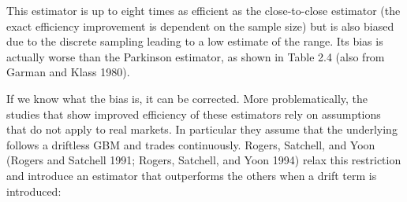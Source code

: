 \documentclass[11pt]{report}
\begin{document}
		This estimator is up to eight times as efficient as the close-to-close estimator (the exact efficiency improvement is dependent on the sample size) but is also biased due to the discrete sampling leading to a low estimate of the range. Its bias is actually worse than the Parkinson estimator, as shown in Table 2.4 (also from Garman and Klass 1980).
		
		If we know what the bias is, it can be corrected. More problematically, the studies that show improved efficiency of these estimators rely on assumptions that do not apply to real markets. In particular they assume that the underlying follows a driftless GBM and trades continuously. Rogers, Satchell, and Yoon (Rogers and Satchell 1991; Rogers, Satchell, and Yoon 1994) relax this restriction and introduce an estimator that outperforms the others when a drift term is introduced:
\end{document}
